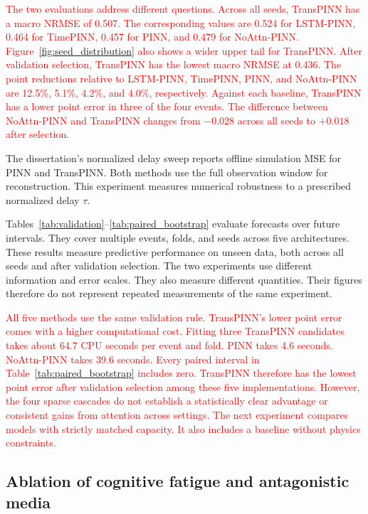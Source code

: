 \documentclass[letterpaper,journal]{IEEEtran}
\begin{document}
\textcolor{red}{
The two evaluations address different questions. Across all seeds, TransPINN has a macro NRMSE of 0.507. The corresponding values are 0.524 for LSTM-PINN, 0.464 for TimePINN, 0.457 for PINN, and 0.479 for NoAttn-PINN. Figure~\ref{fig:seed_distribution} also shows a wider upper tail for TransPINN.
After validation selection, TransPINN has the lowest macro NRMSE at 0.436. The point reductions relative to LSTM-PINN, TimePINN, PINN, and NoAttn-PINN are 12.5\%, 5.1\%, 4.2\%, and 4.0\%, respectively. Against each baseline, TransPINN has a lower point error in three of the four events. The difference between NoAttn-PINN and TransPINN changes from $-0.028$ across all seeds to $+0.018$ after selection.
}

The dissertation's normalized delay sweep reports offline simulation MSE for PINN and TransPINN. Both methods use the full observation window for reconstruction. This experiment measures numerical robustness to a prescribed normalized delay $\tau$.

Tables~\ref{tab:validation}--\ref{tab:paired_bootstrap} evaluate forecasts over future intervals. They cover multiple events, folds, and seeds across five architectures. These results measure predictive performance on unseen data, both across all seeds and after validation selection. The two experiments use different information and error scales. They also measure different quantities. Their figures therefore do not represent repeated measurements of the same experiment.

\textcolor{red}{
All five methods use the same validation rule. TransPINN's lower point error comes with a higher computational cost. Fitting three TransPINN candidates takes about 64.7 CPU seconds per event and fold. PINN takes 4.6 seconds. NoAttn-PINN takes 39.6 seconds. Every paired interval in Table~\ref{tab:paired_bootstrap} includes zero.
TransPINN therefore has the lowest point error after validation selection among these five implementations. However, the four sparse cascades do not establish a statistically clear advantage or consistent gains from attention across settings. The next experiment compares models with strictly matched capacity. It also includes a baseline without physics constraints.
}

	
	
	\subsection{Ablation of cognitive fatigue and antagonistic media}
	\label{sec:mechanism_ablation}
	
\end{document}
